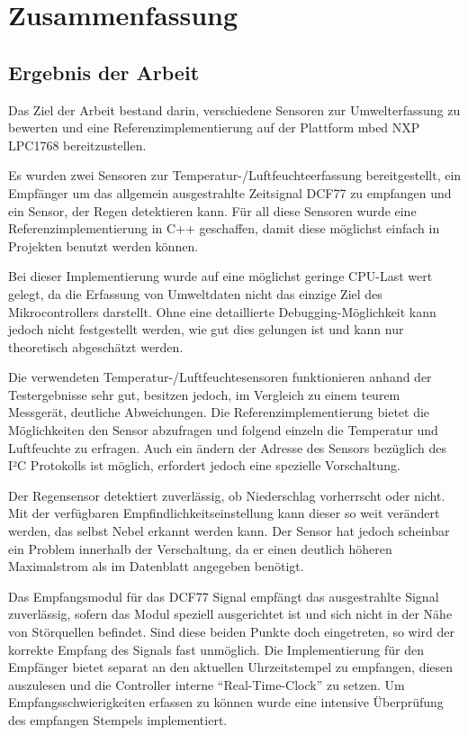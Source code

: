 \chapter{Zusammenfassung}
	\section{Ergebnis der Arbeit}
		Das Ziel der Arbeit bestand darin, verschiedene Sensoren zur Umwelterfassung zu bewerten und eine Referenzimplementierung auf der Plattform mbed NXP LPC1768 bereitzustellen.
		
		Es wurden zwei Sensoren zur Temperatur-/Luftfeuchteerfassung bereitgestellt, ein Empfänger um das allgemein ausgestrahlte Zeitsignal DCF77 zu empfangen und ein Sensor, der Regen detektieren kann. Für all diese Sensoren wurde eine Referenzimplementierung in C++ geschaffen, damit diese möglichst einfach in Projekten benutzt werden können. 
		
		Bei dieser Implementierung wurde auf eine möglichst geringe CPU-Last wert gelegt, da die Erfassung von Umweltdaten nicht das einzige Ziel des Mikrocontrollers darstellt. Ohne eine detaillierte Debugging-Möglichkeit kann jedoch nicht festgestellt werden, wie gut dies gelungen ist und kann nur theoretisch abgeschätzt werden.
		
		Die verwendeten Temperatur-/Luftfeuchtesensoren funktionieren anhand der Testergebnisse sehr gut, besitzen jedoch, im Vergleich zu einem teurem Messgerät, deutliche Abweichungen. Die Referenzimplementierung bietet die Möglichkeiten den Sensor abzufragen und folgend einzeln die Temperatur und Luftfeuchte zu erfragen. Auch ein ändern der Adresse des Sensors bezüglich des I²C Protokolls ist möglich, erfordert jedoch eine spezielle Vorschaltung.
		
		\newpage
		Der Regensensor detektiert zuverlässig, ob Niederschlag vorherrscht oder nicht. Mit der verfügbaren Empfindlichkeitseinstellung kann dieser so weit verändert werden, das selbst Nebel erkannt werden kann. Der Sensor hat jedoch scheinbar ein Problem innerhalb der Verschaltung, da er einen deutlich höheren Maximalstrom als im Datenblatt angegeben benötigt. 
		
		Das Empfangsmodul für das DCF77 Signal empfängt das ausgestrahlte Signal zuverlässig, sofern das Modul speziell ausgerichtet ist und sich nicht in der Nähe von Störquellen befindet. Sind diese beiden Punkte doch eingetreten, so wird der korrekte Empfang des Signals fast unmöglich. Die Implementierung für den Empfänger bietet separat an den aktuellen Uhrzeitstempel zu empfangen, diesen auszulesen und die Controller interne \enquote{Real-Time-Clock} zu setzen. Um Empfangsschwierigkeiten erfassen zu können wurde eine intensive Überprüfung des empfangen Stempels implementiert.
